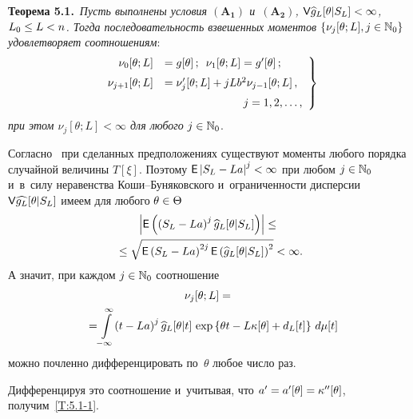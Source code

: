 \begin{multicols}{2}
\noindent
\textbf{Теорема 5.1.}\
\textit{Пусть выполнены условия $\mathbf{(A_1)}$ и~$\mathbf{(A_2)}$,
 $\Vp \widehat{g}_{L}[\theta|S_L]\hm<\infty$, $L_0\hm\le L\hm< n$.
 Тогда последовательность взвешенных моментов
  $\left\{\nu_j[\theta;L], j\hm\in\mathbb{N}_0\right\}$ удовлетворяет соотношениям}:
 \begin{equation}
 \left.
 \begin{array}{rl}
  \nu_0[\theta;L] &=g[\theta]\,;\enskip \nu_1[\theta;L]=g'[\theta]\,;
\\[6pt]
  \nu_{j+1}[\theta;L]&= \nu'_{j}[\theta;L]+jLb^2\nu_{j-1}[\theta;L]\,,\\[6pt] 
  &\hspace*{25mm}j=1,2,\ldots ,
    \end{array}
  \right\}
 \label{T:5.1-1}
 \end{equation}
 \textit{при этом $\nu_j[\theta;L]<\infty$ для любого} $j\hm\in\mathbb{N}_0$.

 \smallskip

 \Do
 Согласно~\cite{16-ch} при сделанных предположениях существуют моменты любого порядка случайной величины $T[\xi]$.
 Поэтому $\Ep\left|  S_L\hm - La\right|^{j}\hm<\infty$ при любом $j\hm\in\Np_0$
 и~в~силу неравенства Ко\-ши--Бу\-ня\-ков\-ско\-го и~ограниченности дисперсии
 ${\sf V} \widehat{g_L}[\theta|S_L]$  имеем для любого $\theta\hm\in\Theta$
 \begin{multline*}
\left|{\sf E} \left(\left( S_L - La\right)^j
  \widehat{g}_{L}[\theta|S_L] \right)\right|\le{}\\
  {}\le
  \sqrt{{\sf E} \left( S_L - La\right)^{2j} 
  {\sf E} \left(\widehat{g}_{L}[\theta|S_L]\right)^2}<\infty.
 \end{multline*}
 А значит, при каждом $j\hm\in\Np_0$ соотношение
 \begin{multline*}
  \nu_j[\theta;L]={}\\
  {}=
  \!\int\limits_{-\infty}^\infty \!\left( t - La\right)^j \widehat{g}_{L}[\theta|t]\,
  \exp\left\{\theta t-L\kappa[\theta]+d_L[t]\right\}\,d\mu[t]\hspace*{-4.45374pt}
 \end{multline*}
 можно почленно дифференцировать по~$\theta$ любое число раз.

 Дифференцируя это соотношение и~учитывая, что $a'\hm=a'[\theta]\hm=\kappa''[\theta]$,  получим~\eqref{T:5.1-1}.

\smallskip


\end{multicols}
